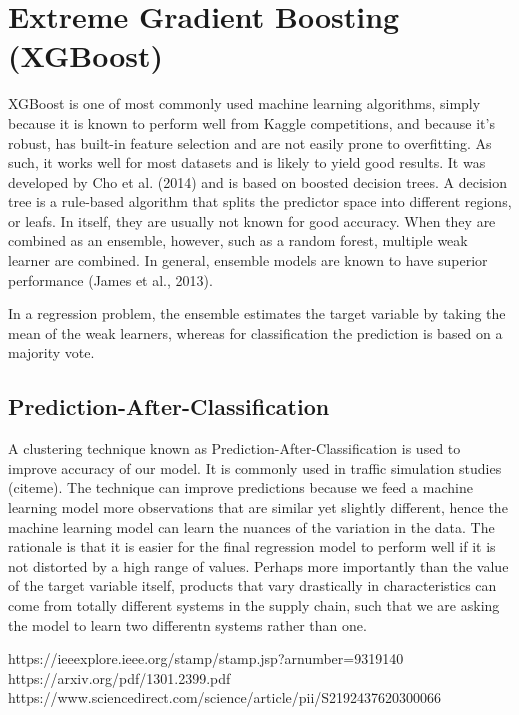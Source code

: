 \documentclass[../../main.tex]{subfiles}
\begin{document}


\section{Extreme Gradient Boosting (XGBoost)}
XGBoost is one of most commonly used machine learning algorithms, simply because it is known to perform well from Kaggle competitions, and because it's robust, has built-in feature selection and are not easily prone to overfitting. As such, it works well for most datasets and is likely to yield good results. It was developed by Cho et al. (2014) and is based on boosted decision trees. A decision tree is a rule-based algorithm that splits the predictor space into different regions, or leafs. In itself, they are usually not known for good accuracy. When they are combined as an ensemble, however, such as a random forest, multiple weak learner are combined. In general, ensemble models are known to have superior performance (James et al., 2013).


In a regression problem, the ensemble estimates the target variable by taking the mean of the weak learners, whereas for classification the prediction is based on a majority vote.

\subsection{Prediction-After-Classification}
A clustering technique known as Prediction-After-Classification is used to improve accuracy of our model. It is commonly used in traffic simulation studies (citeme). The technique can improve predictions because we feed a machine learning model more observations that are similar yet slightly different, hence the machine learning model can learn the nuances of the variation in the data.  The rationale is that it is easier for the final regression model to perform well if it is not distorted by a high range of values. Perhaps more importantly than the value of the target variable itself, products that vary drastically in characteristics can come from totally different systems in the supply chain, such that we are asking the model to learn two differentn systems rather than one. 

https://ieeexplore.ieee.org/stamp/stamp.jsp?arnumber=9319140
https://arxiv.org/pdf/1301.2399.pdf
https://www.sciencedirect.com/science/article/pii/S2192437620300066

\end{document}
